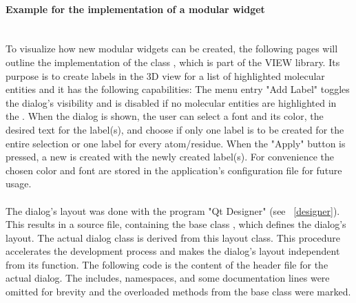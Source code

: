 \paragraph{Example for the implementation of a modular widget}
\hspace*{\fill}\\
To visualize how new modular widgets can be created, the following pages will outline 
the implementation of the class , which is
part of the VIEW library. 
Its purpose is to create labels in the 3D view for a list of 
highlighted molecular entities and it has the following capabilities:
The menu entry {"Add Label"} toggles the dialog's visibility and is 
disabled if no molecular entities are highlighted in the .
When the dialog is shown, the user can select a font and its color, the desired text for 
the label(s), and choose if only one label is to be created for the entire selection or 
one label for every atom/residue.  
When the "Apply" button is pressed, a new  is created with the newly 
created label(s).
For convenience the chosen color and font are stored in the application's configuration 
file for future usage.
\\ 
\\
The dialog's layout was done with the program "Qt Designer" (see ~\ref{designer}).
This results in a source file, containing the base class , which 
defines the dialog's layout. The actual dialog class is derived from this layout class.
This procedure accelerates the development process and makes the dialog's 
layout independent from its function.
The following code is the content of the header file for the actual dialog.
The includes, namespaces, and some documentation lines were omitted for brevity and the
overloaded methods from the  base class were marked.
